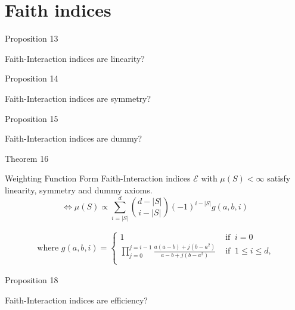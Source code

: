 \documentclass[10pt]{beamer}
\def\Expl{\mathcal{E}}
\begin{document}
\section[Faith interaction index]{Faith indices}
\begin{frame}{Proposition 13}
    \begin{myaxiombox}{Faith-Interaction indices are linearity?}
        
    \end{myaxiombox}
\end{frame}
\begin{frame}{Proposition 14}
    \begin{myaxiombox}{Faith-Interaction indices are symmetry?}
        
    \end{myaxiombox}
\end{frame}
\begin{frame}{Proposition 15}
    \begin{myaxiombox}{Faith-Interaction indices are dummy?}
        
    \end{myaxiombox}
\end{frame}
\begin{frame}{Theorem 16}
    \begin{mytheorembox}{Weighting Function Form}
        Faith-Interaction indices $\Expl$ with $\mu(S) < \infty$ satisfy linearity, symmetry and dummy axioms.
        \vspace{1em}
        \[ \iff
        \mu(S) \propto \sum_{i=|S|}^{d} \binom{d- |S|}{i-|S|}(-1)^{i-|S|} g(a,b,i) 
        \]

    \end{mytheorembox}
    \begin{align*}
        \text{ where }
        g(a,b,i) =
        \begin{cases}
            1 & \text{ if } \ i = 0 \\
            \prod_{j=0}^{j=i-1} \frac{a(a-b) + j(b-a^2)}{a-b + j(b-a^2)}
            & \text{ if } \   1 \leq i \leq d,\\
        \end{cases}
    \end{align*}
\end{frame}
\begin{frame}{Proposition 18}
    \begin{myaxiombox}{Faith-Interaction indices are efficiency?}
        
    \end{myaxiombox}
\end{frame}
\end{document}
